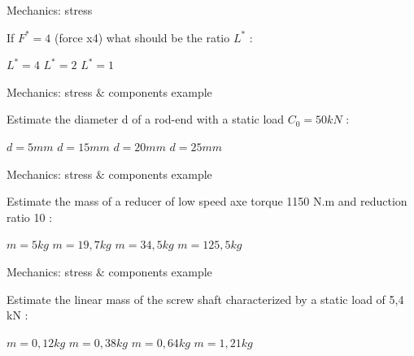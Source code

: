 \documentclass{webquiz}
\begin{document}
    \begin{question} 
  
        \begin{center}
	\large{Mechanics: stress}
\end{center}
	If $F^*=4$ (force x4) what should be the ratio $L^*$ : 
     \begin{choice}
      \incorrect $L^* = 4$
      \correct $L^* = 2$
         \incorrect  $L^* = 1$
     \end{choice} 
   \end{question}
  
  
     \begin{question} 
        \begin{center}
	\large{Mechanics: stress $\&$ components example}
\end{center}
	Estimate the diameter d of a rod-end with a static load $C_0 = 50 kN $ : 
     \begin{choice}
      \incorrect $d = 5 mm$
      \incorrect  $d = 15 mm$
            \correct  $d = 20 mm$
         \incorrect   $d = 25 mm$
     \end{choice} 
   \end{question}
   
       \begin{question} 
            \begin{center}
	\large{Mechanics: stress $\&$ components example}
\end{center}
	Estimate the mass of a reducer of low speed axe torque 1150 N.m and reduction ratio 10 : 
     \begin{choice}
      \incorrect $m = 5 kg$
      \incorrect  $m = 19,7 kg$
           \correct  $m = 34,5 kg$
         \incorrect   $m = 125,5 kg$
     \end{choice} 
   \end{question}
  
 \begin{question} 
            \begin{center}
	\large{Mechanics: stress $\&$ components example}
\end{center}
	Estimate the linear mass  of the screw shaft characterized by a static load of 5,4 kN : 
     \begin{choice}
      \incorrect $m = 0,12 kg$
      \correct  $m = 0,38 kg$
           \incorrect  $m = 0,64 kg$
         \incorrect   $m = 1,21 kg$
     \end{choice} 
   \end{question}
   
\end{document}
